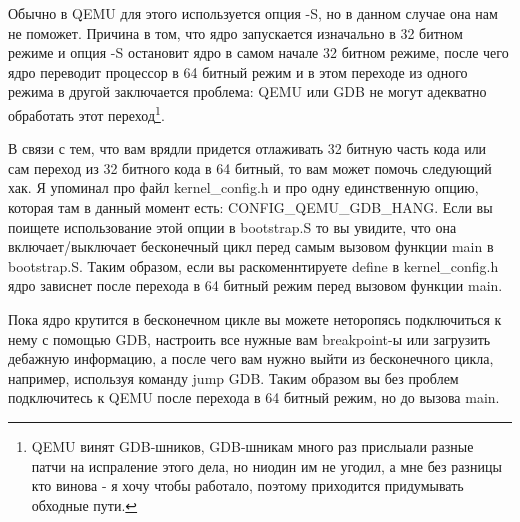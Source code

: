 Обычно в QEMU для этого используется опция -S, но в данном случае она нам не
поможет. Причина в том, что ядро запускается изначально в 32 битном режиме и
опция -S остановит ядро в самом начале 32 битном режиме, после чего ядро
переводит процессор в 64 битный режим и в этом переходе из одного режима в
другой заключается проблема: QEMU или GDB не могут адекватно обработать этот
переход\footnote{QEMU винят GDB-шников, GDB-шникам много раз прислыали разные
патчи на испраление этого дела, но ниодин им не угодил, а мне без разницы кто
винова - я хочу чтобы работало, поэтому приходится придумывать обходные пути.}.

В связи с тем, что вам врядли придется отлаживать 32 битную часть кода или сам
переход из 32 битного кода в 64 битный, то вам может помочь следующий хак. Я
упоминал про файл kernel\_config.h и про одну единственную опцию, которая там
в данный момент есть: CONFIG\_QEMU\_GDB\_HANG. Если вы поищете использование
этой опции в bootstrap.S то вы увидите, что она включает/выключает бесконечный
цикл перед самым вызовом функции main в bootstrap.S. Таким образом, если вы
раскоменнтируете define в kernel\_config.h ядро зависнет после перехода в
64 битный режим перед вызовом функции main.

Пока ядро крутится в бесконечном цикле вы можете неторопясь подключиться к нему
с помощью GDB, настроить все нужные вам breakpoint-ы или загрузить дебажную
информацию, а после чего вам нужно выйти из бесконечного цикла, например,
используя команду jump GDB. Таким образом вы без проблем подключитесь к QEMU
после перехода в 64 битный режим, но до вызова main.
